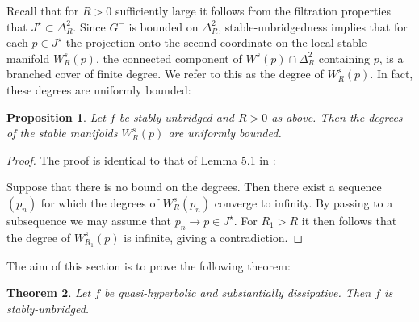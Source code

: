 \documentclass[10pt,a4paper]{article}
\newtheorem{theorem}{Theorem}[section]
\newtheorem{proposition}[theorem]{Proposition}
\begin{document}
Recall that for $R>0$ sufficiently large it follows from the filtration properties that $J^\star \subset \Delta^2_R$. Since $G^-$ is bounded on $\Delta^2_R$, stable-unbridgedness implies that for each $p \in J^\star$ the projection onto the second coordinate on the local stable manifold $W^s_R(p)$, the connected component of $W^s(p) \cap \Delta^2_R$ containing $p$, is a branched cover of finite degree. We refer to this as the degree of $W^s_R(p)$. In fact, these degrees are uniformly bounded:

\begin{proposition}\label{prop:degreebound}
Let $f$ be stably-unbridged and $R>0$ as above. Then the degrees of the stable manifolds $W_R^s(p)$ are uniformly bounded.
\end{proposition}
\begin{proof}
The proof is identical to that of Lemma 5.1 in \cite{LP2}:

Suppose that there is no bound on the degrees. Then there exist a sequence $(p_n)$ for which the degrees of $W_R^s(p_n)$ converge to infinity. By passing to a subsequence we may assume that $p_n \rightarrow p \in J^\star$. For $R_1>R$ it then follows that the degree of $W_{R_1}^s(p)$ is infinite, giving a contradiction.
\end{proof}


The aim of this section is to prove the following theorem:
\begin{theorem}
\label{boundedlevset}
Let $f$ be quasi-hyperbolic and substantially dissipative. Then $f$ is stably-unbridged.
\end{theorem}
\end{document}
